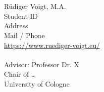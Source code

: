 \begin{titlepage}
{\let\newpage\relax\maketitle}
\ \\
\vfill %
%
\ \\
\foreignlanguage{ngerman}{Rüdiger Voigt, M.A.}\\
Student-ID\\
Address\\
Mail / Phone\\
\url{https://www.ruediger-voigt.eu/}\\
\ \\
Advisor: \foreignlanguage{ngerman}{Professor Dr. X}\\
Chair of \dots\\
University of Cologne\\
\end{titlepage}